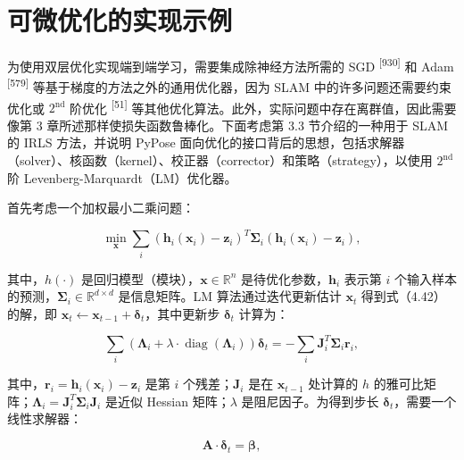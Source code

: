 \section{可微优化的实现示例}

为使用双层优化实现端到端学习，需要集成除神经方法所需的 SGD \textsuperscript{[930]} 和 Adam \textsuperscript{[579]} 等基于梯度的方法之外的通用优化器，因为 SLAM 中的许多问题还需要约束优化或 $2 ^ { \mathrm { n d } }$ 阶优化 \textsuperscript{[51]} 等其他优化算法。此外，实际问题中存在离群值，因此需要像第 3 章所述那样使损失函数鲁棒化。下面考虑第 3.3 节介绍的一种用于 SLAM 的 IRLS 方法，并说明 PyPose 面向优化的接口背后的思想，包括求解器（solver）、核函数（kernel）、校正器（corrector）和策略（strategy），以使用 $2 ^ { \mathrm { n d } }$ 阶 Levenberg-Marquardt（LM）优化器。

首先考虑一个加权最小二乘问题：

\begin{equation}
\min _ {\boldsymbol {x}} \sum_ {i} \left(\boldsymbol {h} _ {i} (\boldsymbol {x} _ {i}) - \boldsymbol {z} _ {i}\right) ^ {T} \boldsymbol {\Sigma} _ {i} \left(\boldsymbol {h} _ {i} (\boldsymbol {x} _ {i}) - \boldsymbol {z} _ {i}\right),\tag{4.42}
\end{equation}

其中，$h(\cdot)$ 是回归模型（模块），$\pmb{x} \in \mathbb{R}^{n}$ 是待优化参数，$\pmb{h}_i$ 表示第 $i$ 个输入样本的预测，$\pmb{\Sigma}_i \in \mathbb{R}^{d \times d}$ 是信息矩阵。LM 算法通过迭代更新估计 $\pmb{x}_t$ 得到式（4.42）的解，即 $\pmb{x}_t \gets \pmb{x}_{t-1} + \pmb{\delta}_t$，其中更新步 $\pmb{\delta}_t$ 计算为：

\begin{equation}
\sum_ {i} \left(\boldsymbol {\Lambda} _ {i} + \lambda \cdot \operatorname{diag} \left(\boldsymbol {\Lambda} _ {i}\right)\right) \boldsymbol {\delta} _ {t} = - \sum_ {i} \boldsymbol {J} _ {i} ^ {T} \boldsymbol {\Sigma} _ {i} \boldsymbol {r} _ {i},\tag{4.43}
\end{equation}

其中，$\pmb{r}_i = \pmb{h}_i(\pmb{x}_i) - \pmb{z}_i$ 是第 $i$ 个残差；$\pmb{J}_i$ 是在 $\pmb{x}_{t-1}$ 处计算的 $h$ 的雅可比矩阵；$\pmb{\Lambda}_i = \pmb{J}_i^{T}\pmb{\Sigma}_i\pmb{J}_i$ 是近似 Hessian 矩阵；$\lambda$ 是阻尼因子。为得到步长 $\pmb{\delta}_t$，需要一个线性求解器：

\begin{equation}
\mathbf {A} \cdot \boldsymbol {\delta} _ {t} = \boldsymbol {\beta},\tag{4.44}
\end{equation}

